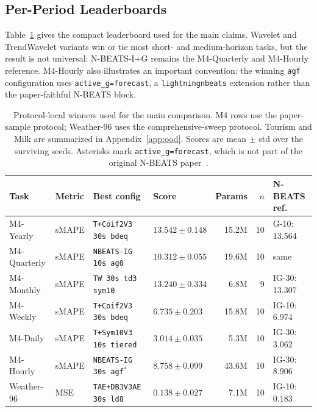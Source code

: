 \documentclass[11pt,a4paper]{article}
\begin{document}
\subsection{Per-Period Leaderboards}
\label{sec:m4_leaderboards}

Table~\ref{tab:main_leaderboard} gives the compact leaderboard used for the main claims. Wavelet and TrendWavelet variants win or tie most short- and medium-horizon tasks, but the result is not universal: N-BEATS-I+G \citep{oreshkin2020nbeats} remains the M4-Quarterly and M4-Hourly reference. M4-Hourly also illustrates an important convention: the winning \texttt{agf} configuration uses \texttt{active\_g=forecast}, a \texttt{lightningnbeats} extension rather than the paper-faithful N-BEATS block.

\begin{table}[t]
  \caption{Protocol-local winners used for the main comparison. M4 rows use the paper-sample protocol; Weather-96 uses the comprehensive-sweep protocol. Tourism and Milk are summarized in Appendix~\ref{app:ood}. Scores are mean $\pm$ std over the surviving seeds. Asterisks mark \texttt{active\_g=forecast}, which is not part of the original N-BEATS paper~\citep{oreshkin2020nbeats}.}
  \label{tab:main_leaderboard}
  \centering
  \scriptsize
  \setlength{\tabcolsep}{2.3pt}
  \begin{tabular}{llllrrl}
    \toprule
    Task & Metric & Best config & Score & Params & $n$ & N-BEATS ref. \\
    \midrule
    M4-Yearly    & sMAPE & \texttt{T+Coif2V3 30s bdeq}     & $13.542 \pm 0.148$ & 15.2M & 10 & G-10: 13.564 \\
    M4-Quarterly & sMAPE & \texttt{NBEATS-IG 10s ag0}      & $10.312 \pm 0.055$ & 19.6M & 10 & same \\
    M4-Monthly   & sMAPE & \texttt{TW 30s td3 sym10}       & $13.240 \pm 0.334$ & 6.8M  & 9  & IG-30: 13.307 \\
    M4-Weekly    & sMAPE & \texttt{T+Coif2V3 30s bdeq}     & $6.735 \pm 0.203$  & 15.8M & 10 & IG-10: 6.974 \\
    M4-Daily     & sMAPE & \texttt{T+Sym10V3 10s tiered}   & $3.014 \pm 0.035$  & 5.3M  & 10 & IG-30: 3.062 \\
    M4-Hourly    & sMAPE & \texttt{NBEATS-IG 30s agf}$^*$  & $8.758 \pm 0.099$  & 43.6M & 10 & IG-30: 8.906 \\
    Weather-96   & MSE   & \texttt{TAE+DB3V3AE 30s ld8}    & $0.138 \pm 0.027$  & 7.1M  & 10 & IG-10: 0.183 \\
    \bottomrule
  \end{tabular}
\end{table}
\end{document}
